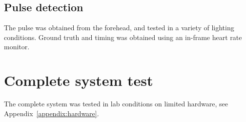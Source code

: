 \subsection{Pulse detection}
The pulse was obtained from the forehead, and tested in a variety of lighting conditions. Ground truth and timing was obtained using an in-frame heart rate monitor. 


\section{Complete system test}
The complete system was tested in lab conditions on limited hardware, see Appendix~\ref{appendix:hardware}. 

\section{}
